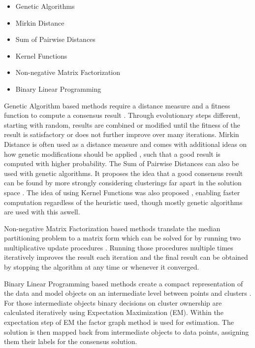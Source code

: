 \documentclass[
	a4paper,
	english,
	twoside,
	openright,               
	11pt                            
	]{report}
\begin{document}
\begin{itemize}
  \item Genetic Algorithms
  \item Mirkin Distance
  \item Sum of Pairwise Distances
  \item Kernel Functions
  \item Non-negative Matrix Factorization
  \item Binary Linear Programming
\end{itemize}

Genetic Algorithm based methods require a distance measure and a fitness function to compute a consensus result \cite{Cristofor2002FindingMP}. Through evolutionary steps different, starting with random, results are combined or modified until the fitness of the result is satisfactory or does not further improve over many iterations. Mirkin Distance is often used as a distance measure and comes with additional ideas on how genetic modifications should be applied \cite{5766165}, such that a good result is computed with higher probability. The Sum of Pairwise Distances can also be used with genetic algorithms. It proposes the idea that a good consensus result can be found by more strongly considering clusterings far apart in the solution space \cite{6694095}. The idea of using Kernel Functions was also proposed \cite{Vega-Pons:2010:WPC:1786814.1787121}, enabling faster computation regardless of the heuristic used, though mostly genetic algorithms are used with this aswell.

Non-negative Matrix Factorization based methods translate the median partitioning problem to a matrix form which can be solved for by running two multiplicative update procedures \cite{Li:2007:SCS:1441428.1442121}. Running those procedures multiple times iteratively improves the result each iteration and the final result can be obtained by stopping the algorithm at any time or whenever it converged.

Binary Linear Programming based methods create a compact representation of the data and model objects on an intermediate level between points and clusters \cite{HUANG2016131}. For those intermediate objects binary decisions on cluster ownership are calculated iteratively using Expectation Maximization (EM). Within the expectation step of EM the factor graph method \cite{HUANG2016131} is used for estimation. The solution is then mapped back from intermediate objects to data points, assigning them their labels for the consensus solution.
\end{document}
